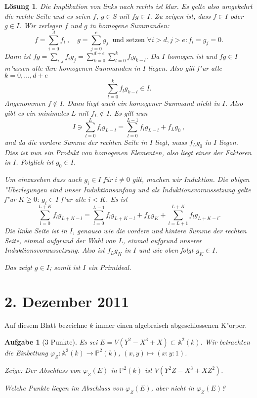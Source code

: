 \documentclass[a4paper, 12pt, numbers=noendperiod, chapterprefix=true, headsepline]{scrbook}
\theoremstyle{break}
\newtheorem{Aufg}{Aufgabe}
\newtheorem{Loes}{L\"osung}
\theoremstyle{nonumberbreak}
\theoremstyle{nonumberplain}
\newcommand{\A}{\mathbb{A}}
\newcommand{\IP}{\mathbb{P}}%
\begin{document}
\begin{Loes}
Die Implikation von links nach rechts ist klar. Es gelte also umgekehrt die rechte Seite und es seien $f$, $g\in S$ mit $fg\in I$. Zu zeigen ist, dass $f\in I$ oder $g\in I$. Wir zerlegen $f$ und $g$ in homogene Summanden:
	\[f= \sum_{i=0}^d f_i\ ,\quad g= \sum_{j=0}^e g_j\ \textrm{ und setzen } \forall i > d,j > e: f_i=g_j=0 .\]
Dann ist $fg = \sum_{i,j} f_ig_j = \sum_{k=0}^{d+e} \sum_{l=0}^k f_lg_{k-l}$. Da $I$ homogen ist und $fg\in I$ m"ussen alle ihre homogenen Summanden in $I$ liegen. Also gilt f"ur alle $k=0,\dots,d+e$
	\[\sum_{l=0}^k f_lg_{k-l} \in I.\]
Angenommen $f\not\in I$. Dann liegt auch ein homogener Summand nicht in $I$. Also gibt es ein minimales $L$ mit $f_L \not\in I$. Es gilt nun
	\[I\ni \sum_{l=0}^L f_lg_{L-l} = \sum_{l=0}^{L-1}f_lg_{L-l} + f_Lg_0\ ,\]
und da die vordere Summe der rechten Seite in $I$ liegt, muss $f_Lg_0$ in $I$ liegen. Dies ist nun ein Produkt von homogenen Elementen, also liegt einer der Faktoren in $I$. Folglich ist $g_0\in I$.

Um einzusehen dass auch $g_i\in I$ für $i\neq 0$ gilt, machen wir Induktion. Die obigen "Uberlegungen sind unser Induktionsanfang und als Induktionsvoraussetzung gelte f"ur $K\geq 0$: $g_i\in I$ f"ur alle $i< K$. Es ist
	\[\sum_{l=0}^{L+K} f_lg_{L+K-l} = \sum_{l=0}^{L-1}f_lg_{L+K-l} + f_Lg_K + \sum_{l=L+1}^{L+K}f_lg_{L+K-l}.\]
Die linke Seite ist in $I$, genauso wie die vordere und hintere Summe der rechten Seite, einmal aufgrund der Wahl von $L$, einmal aufgrund unserer Induktionsvoraussetzung. Also ist $f_Lg_K$ in $I$ und wie oben folgt $g_K\in I$.

Das zeigt $g\in I$; somit ist $I$ ein Primideal.
\end{Loes}

\newpage
\section{2. Dezember 2011}
\setcounter{Aufg}{0}
\setcounter{Loes}{3}

Auf diesem Blatt bezeichne $k$ immer einen algebraisch abgeschlossenen K"orper.

\begin{Aufg}[3 Punkte]
Es sei $E = V(Y^2 - X^3 + X)\subset \A^2(k)$. Wir betrachten die Einbettung $\varphi_Z: \A^2(k)\to \IP^2(k)$, $(x,y)\mapsto (x:y:1)$.

Zeige: Der Abschluss von $\varphi_Z(E)$ in $\IP^2(k)$ ist $V(Y^2Z - X^3 + XZ^2)$.

Welche Punkte liegen im Abschluss von $\varphi_Z(E)$, aber nicht in $\varphi_Z(E)$?
\end{Aufg}
\end{document}
